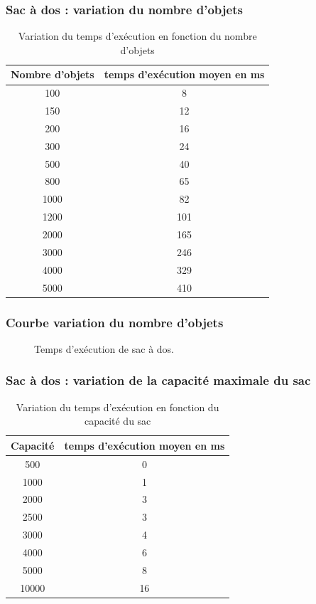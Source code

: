 \documentclass[french]{beamer}
\begin{document}
  \begin{frame}
    \frametitle{Sac à dos : variation du nombre d'objets}
\begin{table}[h!]
\centering
\begin{tabular}{|c|c|}
\hline
Nombre d'objets & temps d'exécution moyen en ms\\
\hline
100 & 8\\
\hline
150 & 12\\
\hline
200 & 16\\
\hline
300 & 24\\
\hline
500 & 40\\
\hline
800 & 65\\
\hline
1000 & 82\\
\hline
1200 & 101\\
\hline
2000 & 165\\
\hline
3000 & 246\\
\hline
 4000 & 329\\
\hline
  5000 & 410\\
\hline
\end{tabular}
\caption {Variation du temps d'exécution en fonction du nombre d'objets}
\end{table}
  \end{frame}

  \begin{frame}
    \frametitle{Courbe variation du nombre d'objets}
\begin{figure}[h!]
\centering
{}
\caption{Temps d'exécution de sac à dos.}
\end{figure}
  \end{frame}

 \begin{frame}
    \frametitle{Sac à dos : variation de la capacité maximale du sac}
\begin{table}[h!]
\centering
\begin{tabular}{|c|c|}
\hline
Capacité & temps d'exécution moyen en ms\\
\hline
500 & 0\\
\hline
1000 & 1\\
\hline
2000 & 3\\
\hline
2500 & 3\\
\hline
3000 & 4\\
\hline
4000 & 6\\
\hline
5000 & 8\\
\hline
10000 & 16\\
\hline
\end{tabular}
\caption {Variation du temps d'exécution en fonction du capacité du sac}
\end{table}
  \end{frame}
\end{document}
